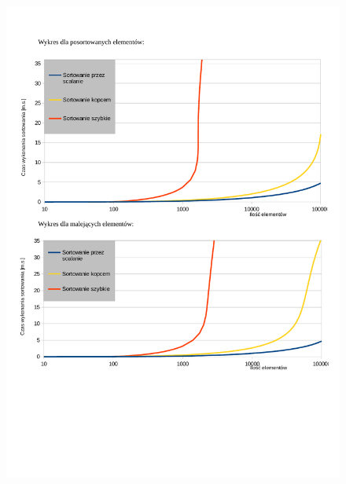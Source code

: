 \documentclass{article}
\begin{document}
\begin{figure}[H]
\includegraphics[width=\textwidth]{sort_czas2.pdf}
\label{fig:sort_czas2.pdf}
\end{figure}
\end{document}
